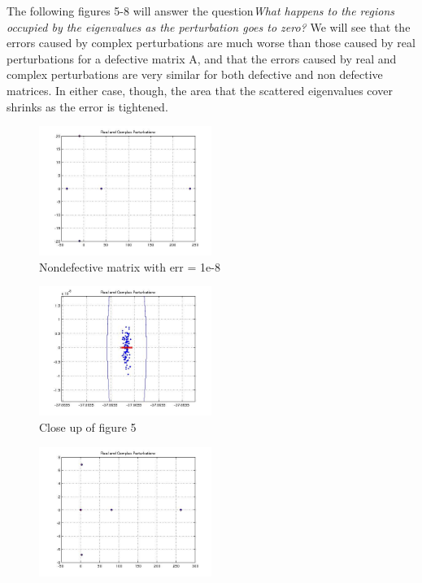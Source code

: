\documentclass[a4paper]{article}
\begin{document}
\begin{enumerate}
The following figures 5-8 will answer the question\emph{What happens to the regions occupied by the eigenvalues as the perturbation goes to zero?} We will see that the errors caused by complex perturbations are much worse than those caused by real perturbations for a defective matrix A, and that the errors caused by real and complex perturbations are very similar for both defective and non defective matrices. In either case, though, the area that the scattered eigenvalues cover shrinks as the error is tightened.

\begin{figure}
\centering
\includegraphics[width=0.5\textwidth]{1em8realout.jpg}
\caption{Nondefective matrix with err = 1e-8}
\end{figure}
\begin{figure}
\centering
\includegraphics[width=0.5\textwidth]{1em8real.jpg}
\caption{Close up of figure 5}
\end{figure}
\begin{figure}
\centering
\includegraphics[width=0.5\textwidth]{1em8outdef.jpg}

\end{figure}
\end{enumerate}
\end{document}
